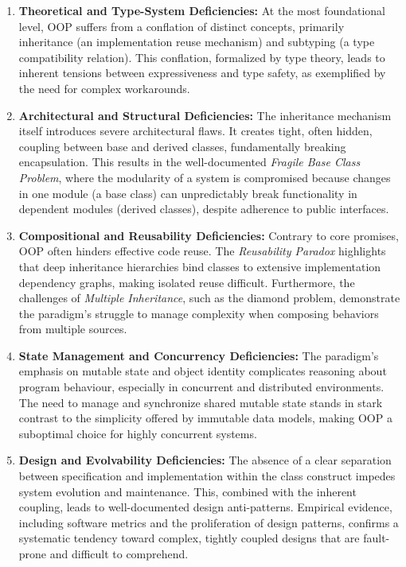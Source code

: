 \begin{enumerate}
    \item \textbf{Theoretical and Type-System Deficiencies:} At the most foundational level, OOP suffers from a conflation of distinct concepts, primarily inheritance (an implementation reuse mechanism) and subtyping (a type compatibility relation). This conflation, formalized by type theory, leads to inherent tensions between expressiveness and type safety, as exemplified by the need for complex workarounds.

    \item \textbf{Architectural and Structural Deficiencies:} The inheritance mechanism itself introduces severe architectural flaws. It creates tight, often hidden, coupling between base and derived classes, fundamentally breaking encapsulation. This results in the well-documented \textit{Fragile Base Class Problem}, where the modularity of a system is compromised because changes in one module (a base class) can unpredictably break functionality in dependent modules (derived classes), despite adherence to public interfaces.

    \item \textbf{Compositional and Reusability Deficiencies:} Contrary to core promises, OOP often hinders effective code reuse. The \textit{Reusability Paradox} highlights that deep inheritance hierarchies bind classes to extensive implementation dependency graphs, making isolated reuse difficult. Furthermore, the challenges of \textit{Multiple Inheritance}, such as the diamond problem, demonstrate the paradigm's struggle to manage complexity when composing behaviors from multiple sources.

    \item \textbf{State Management and Concurrency Deficiencies:} The paradigm's emphasis on mutable state and object identity complicates reasoning about program behaviour, especially in concurrent and distributed environments. The need to manage and synchronize shared mutable state stands in stark contrast to the simplicity offered by immutable data models, making OOP a suboptimal choice for highly concurrent systems.

    \item \textbf{Design and Evolvability Deficiencies:} The absence of a clear separation between specification and implementation within the class construct impedes system evolution and maintenance. This, combined with the inherent coupling, leads to well-documented design anti-patterns. Empirical evidence, including software metrics and the proliferation of design patterns, confirms a systematic tendency toward complex, tightly coupled designs that are fault-prone and difficult to comprehend.
\end{enumerate}
